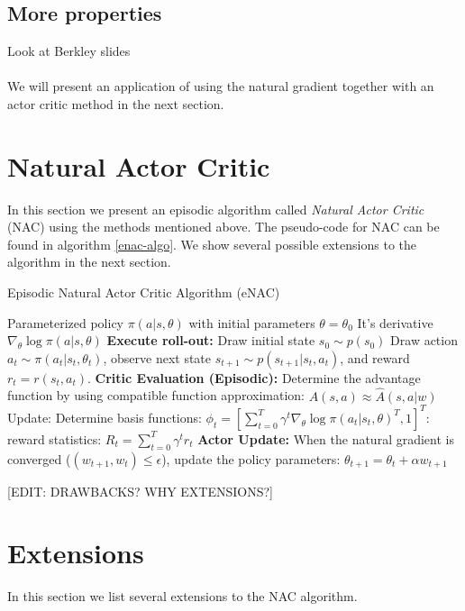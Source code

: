 \subsection{More properties}
Look at Berkley slides
\\
\\
We will present an application of using the natural gradient together with an actor critic method in the next section.
\section{Natural Actor Critic}
In this section we present an episodic algorithm called \textit{Natural Actor Critic} (NAC) \cite{peters2005natural} using the methods mentioned above. The pseudo-code for NAC can be found in algorithm \ref{enac-algo}. We show several possible extensions to the algorithm in the next section.
\begin{algorithm}
	\caption{Episodic Natural Actor Critic Algorithm (eNAC)}\label{enac-algo}
	\begin{algorithmic}
		\REQUIRE Parameterized policy $\pi(a|s,\theta)$ with initial parameters $\theta=\theta_0$
		\REQUIRE It's derivative $\nabla_\theta\log\pi(a|s,\theta)$
		\STATE \textbf{Execute roll-out:} Draw initial state $s_0 \sim p(s_0)$
		\STATE Draw action $a_t\sim\pi(a_t|s_t,\theta_t)$, observe next state $s_{t+1} \sim p(s_{t+1}|s_t, a_t)$, and reward $r_t = r(s_t, a_t)$.
		\ENDFOR
		\ENDFOR
		\STATE \textbf{Critic Evaluation (Episodic):} Determine the advantage function by using compatible function approximation: $A(s, a) \approx \hat{A}(s, a|w)$
		\STATE Update: Determine basis functions: $\phi_t = \left[\sum_{t=0}^T\gamma^t\nabla_\theta\log\pi(a_t|s_t,\theta)^T, 1\right]^T$: reward statistics: $R_t=\sum_{t=0}^T\gamma^t r_t$
		\STATE \textbf{Actor Update:} When the natural gradient is converged ($(w_{t+1}, w_t)\leq\epsilon$), update the policy parameters: $\theta_{t+1} = \theta_t + \alpha w_{t+1}$
		\ENDFOR
	\end{algorithmic}
\end{algorithm}
[EDIT: DRAWBACKS? WHY EXTENSIONS?]
\newpage
\section{Extensions}
In this section we list several extensions to the NAC algorithm. 
